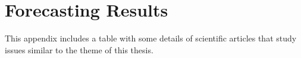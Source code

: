 \chapter{Forecasting Results}


\label{chapter:appendixD}

This appendix includes a table with some details of scientific articles that study issues similar to the theme of this thesis.
